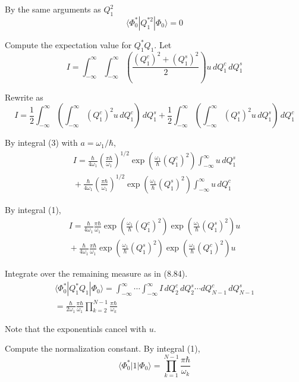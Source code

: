 \documentclass[12pt]{article}
\begin{document}
By the same arguments as $Q_1^2$
\begin{equation*}
\langle\Phi_0^*|Q_1^{*2}|\Phi_0\rangle=0
\end{equation*}

Compute the expectation value for $Q_1^*Q_1$.
Let
\begin{equation*}
I=\int_{-\infty}^\infty\int_{-\infty}^\infty
\left(\frac{(Q_1^c)^2+(Q_1^s)^2}{2}\right)
u\,dQ_1^c\,dQ_1^s
\end{equation*}

Rewrite as
\begin{equation*}
I=\frac{1}{2}\int_{-\infty}^\infty\left(\int_{-\infty}^\infty (Q_1^c)^2
u\,dQ_1^c\right)\,dQ_1^s
+\frac{1}{2}\int_{-\infty}^\infty\left(\int_{-\infty}^\infty (Q_1^s)^2
u\,dQ_1^s\right)\,dQ_1^c
\end{equation*}

By integral (3) with $a=\omega_1/\hbar$,
\begin{multline*}
I=
\frac{\hbar}{4\omega_1}
\left(\frac{\pi\hbar}{\omega_1}\right)^{1/2}
\exp\left(\frac{\omega_1}{\hbar}(Q_1^c)^2\right)
\int_{-\infty}^\infty u\,dQ_1^s
\\
{}+\frac{\hbar}{4\omega_1}
\left(\frac{\pi\hbar}{\omega_1}\right)^{1/2}
\exp\left(\frac{\omega_1}{\hbar}(Q_1^s)^2\right)
\int_{-\infty}^\infty u\,dQ_1^c
\end{multline*}

By integral (1),
\begin{multline*}
I=
\frac{\hbar}{4\omega_1}
\frac{\pi\hbar}{\omega_1}
\exp\left(\frac{\omega_1}{\hbar}(Q_1^c)^2\right)
\exp\left(\frac{\omega_1}{\hbar}(Q_1^s)^2\right)
u
\\
{}+
\frac{\hbar}{4\omega_1}
\frac{\pi\hbar}{\omega_1}
\exp\left(\frac{\omega_1}{\hbar}(Q_1^s)^2\right)
\exp\left(\frac{\omega_1}{\hbar}(Q_1^c)^2\right)
u
\end{multline*}

Integrate over the remaining measure as in (8.84).
\begin{multline*}
\langle\Phi_0^*|Q_1^*Q_1|\Phi_0\rangle
=\int_{-\infty}^\infty\cdots\int_{-\infty}^\infty I\,dQ_2^c\,dQ_2^s\cdots dQ_{N-1}^c\,dQ_{N-1}^s
\\
=\frac{\hbar}{2\omega_1}
\frac{\pi\hbar}{\omega_1}
\prod_{k=2}^{N-1}\frac{\pi\hbar}{\omega_k}
\tag{7}
\end{multline*}

Note that the exponentials cancel with $u$.

\bigskip
Compute the normalization constant.
By integral (1),
\begin{equation*}
\langle\Phi_0^*|1|\Phi_0\rangle
=\prod_{k=1}^{N-1}\frac{\pi\hbar}{\omega_k}
\tag{8}
\end{equation*}
\end{document}
